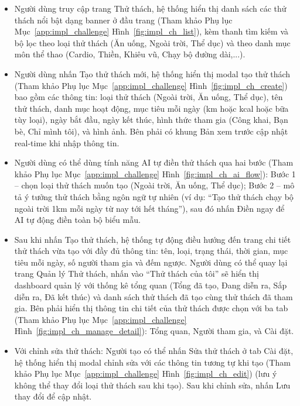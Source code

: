 \begin{itemize}
    \item Người dùng truy cập trang Thử thách, hệ thống hiển thị danh sách các thử thách nổi bật dạng banner ở đầu trang (Tham khảo Phụ lục Mục~\ref{app:impl_challenge} Hình~\ref{fig:impl_ch_list}), kèm thanh tìm kiếm và bộ lọc theo loại thử thách (Ăn uống, Ngoài trời, Thể dục) và theo danh mục môn thể thao (Cardio, Thiền, Khiêu vũ, Chạy bộ đường dài,...).


    \item Người dùng nhấn Tạo thử thách mới, hệ thống hiển thị modal tạo thử thách (Tham khảo Phụ lục Mục~\ref{app:impl_challenge} Hình~\ref{fig:impl_ch_create}) bao gồm các thông tin: loại thử thách (Ngoài trời, Ăn uống, Thể dục), tên thử thách, danh mục hoạt động, mục tiêu mỗi ngày (km hoặc kcal hoặc bữa tùy loại), ngày bắt đầu, ngày kết thúc, hình thức tham gia (Công khai, Bạn bè, Chỉ mình tôi), và hình ảnh. Bên phải có khung Bản xem trước cập nhật real-time khi nhập thông tin.


    \item Người dùng có thể dùng tính năng AI tự điền thử thách qua hai bước (Tham khảo Phụ lục Mục~\ref{app:impl_challenge} Hình~\ref{fig:impl_ch_ai_flow}): Bước 1 -- chọn loại thử thách muốn tạo (Ngoài trời, Ăn uống, Thể dục); Bước 2 -- mô tả ý tưởng thử thách bằng ngôn ngữ tự nhiên (ví dụ: ``Tạo thử thách chạy bộ ngoài trời 1km mỗi ngày từ nay tới hết tháng''), sau đó nhấn Điền ngay để AI tự động điền toàn bộ biểu mẫu.


    \item Sau khi nhấn Tạo thử thách, hệ thống tự động điều hướng đến trang chi tiết thử thách vừa tạo với đầy đủ thông tin: tên, loại, trạng thái, thời gian, mục tiêu mỗi ngày, số người tham gia và đếm ngược. Người dùng có thể quay lại trang Quản lý Thử thách, nhấn vào ``Thử thách của tôi'' sẽ hiển thị dashboard quản lý với thống kê tổng quan (Tổng đã tạo, Đang diễn ra, Sắp diễn ra, Đã kết thúc) và danh sách thử thách đã tạo cùng thử thách đã tham gia. Bên phải hiển thị thông tin chi tiết của thử thách được chọn với ba tab (Tham khảo Phụ lục Mục~\ref{app:impl_challenge} Hình~\ref{fig:impl_ch_manage_detail}): Tổng quan, Người tham gia, và Cài đặt.


    \item Với chỉnh sửa thử thách: Người tạo có thể nhấn Sửa thử thách ở tab Cài đặt, hệ thống hiển thị modal chỉnh sửa với các thông tin tương tự khi tạo (Tham khảo Phụ lục Mục~\ref{app:impl_challenge} Hình~\ref{fig:impl_ch_edit}) (lưu ý không thể thay đổi loại thử thách sau khi tạo). Sau khi chỉnh sửa, nhấn Lưu thay đổi để cập nhật.

\end{itemize}

